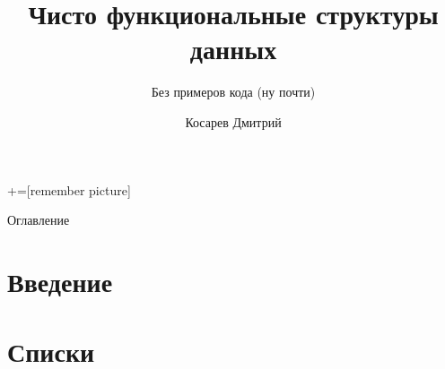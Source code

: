 \documentclass[aspectratio=169
  , xcolor={svgnames}
  , hyperref=
      { colorlinks
      , urlcolor=DarkBlue 
      }  
  , russian  %
  ]{beamer}
\title[PFDS без примеров кода (ну почти)]{Чисто функциональные структуры данных}
\subtitle{Без примеров кода (ну почти)}
\author{Косарев Дмитрий}
\institute{матмех СПбГУ}
\theoremstyle{exerciseStyle1}
\begin{document}
\maketitle

+=[remember picture] 

\everymath{\displaystyle}

\begin{frame}{Оглавление}
  \tableofcontents
\end{frame}

%  


\section{Введение}


\section{Списки}

\end{document}

